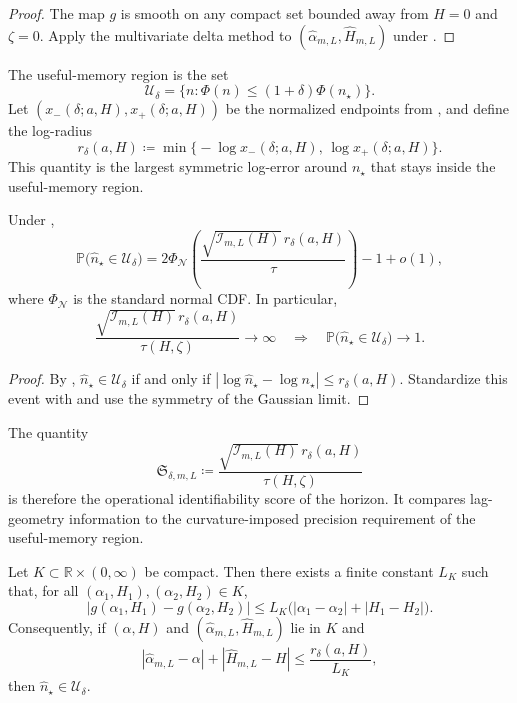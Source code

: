 \begin{proof}
The map $g$ is smooth on any compact set bounded away from $H=0$ and
$\zeta=0$. Apply the multivariate delta method to
$(\widehat \alpha_{m,L},\widehat H_{m,L})$ under
.
\end{proof}

The useful-memory region is the set
\[
  \mathcal U_\delta = \{n : \Phi(n) \le (1+\delta)\Phi(n_\star)\}.
\]
Let $(x_-(\delta;a,H),x_+(\delta;a,H))$ be the normalized endpoints from
, and define the log-radius
\[
  r_\delta(a,H)
  \coloneqq
  \min\bigl\{-\log x_-(\delta;a,H),\,\log x_+(\delta;a,H)\bigr\}.
\]
This quantity is the largest symmetric log-error around $n_\star$ that stays
inside the useful-memory region.

\begin{theorem}
\label{thm:operational_identifiability}
Under ,
\[
  \mathbb P\bigl(\widehat n_\star \in \mathcal U_\delta\bigr)
  =
  2\Phi_{\mathcal N}\!\left(
    \frac{\sqrt{\mathcal I_{m,L}(H)}\,r_\delta(a,H)}{\tau}
  \right) - 1 + o(1),
\]
where $\Phi_{\mathcal N}$ is the standard normal CDF. In particular,
\[
  \frac{\sqrt{\mathcal I_{m,L}(H)}\,r_\delta(a,H)}{\tau(H,\zeta)} \to \infty
  \quad \Longrightarrow \quad
  \mathbb P\bigl(\widehat n_\star \in \mathcal U_\delta\bigr) \to 1.
\]
\end{theorem}

\begin{proof}
By ,
$\widehat n_\star \in \mathcal U_\delta$ if and only if
$|\log \widehat n_\star - \log n_\star| \le r_\delta(a,H)$. Standardize this
event with  and use the symmetry of the Gaussian
limit.
\end{proof}

The quantity
\[
  \mathfrak S_{\delta,m,L}
  \coloneqq
  \frac{\sqrt{\mathcal I_{m,L}(H)}\,r_\delta(a,H)}{\tau(H,\zeta)}
\]
is therefore the operational identifiability score of the horizon. It compares
lag-geometry information to the curvature-imposed precision requirement of the
useful-memory region.

\begin{proposition}
\label{prop:deterministic_horizon_stability}
Let $K\subset \mathbb R\times(0,\infty)$ be compact. Then there exists a finite
constant $L_K$ such that, for all $(\alpha_1,H_1),(\alpha_2,H_2)\in K$,
\[
  |g(\alpha_1,H_1)-g(\alpha_2,H_2)|
  \le L_K\bigl(|\alpha_1-\alpha_2|+|H_1-H_2|\bigr).
\]
Consequently, if $(\alpha,H)$ and $(\widehat\alpha_{m,L},\widehat H_{m,L})$ lie in
$K$ and
\[
  |\widehat\alpha_{m,L}-\alpha|+|\widehat H_{m,L}-H|
  \le \frac{r_\delta(a,H)}{L_K},
\]
then $\widehat n_\star\in \mathcal U_\delta$.
\end{proposition}

